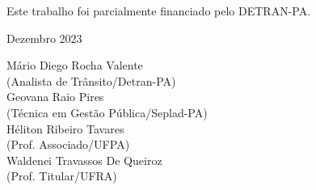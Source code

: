 Este trabalho foi parcialmente financiado pelo DETRAN-PA.

\vst

\begin{centering}

\vst

Dezembro 2023 
\vsm

Mário Diego Rocha Valente \\
(Analista de Trânsito/Detran-PA) \\

Geovana Raio Pires \\
(Técnica em Gestão Pública/Seplad-PA)\\

Héliton Ribeiro Tavares \\ 
(Prof. Associado/UFPA)\\

Waldenei Travassos De Queiroz \\
(Prof. Titular/UFRA)\\



\end{centering}
